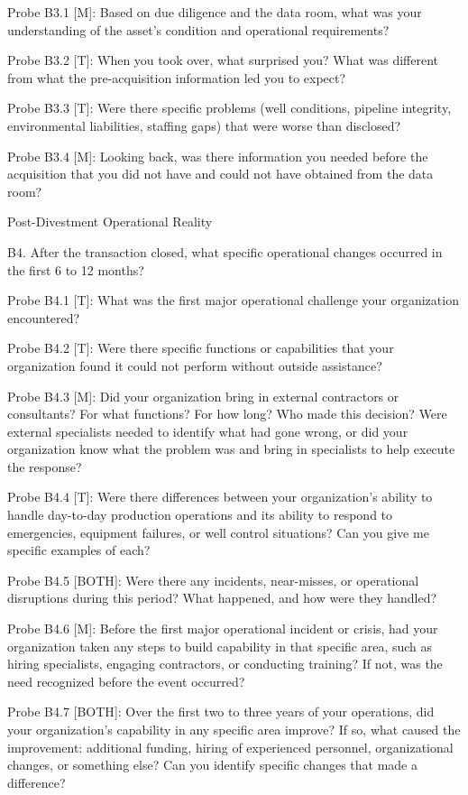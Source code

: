 Probe B3.1 {[}M{]}: Based on due diligence and the data room, what was
your understanding of the asset's condition and operational
requirements?

Probe B3.2 {[}T{]}: When you took over, what surprised you? What was
different from what the pre-acquisition information led you to expect?

Probe B3.3 {[}T{]}: Were there specific problems (well conditions,
pipeline integrity, environmental liabilities, staffing gaps) that were
worse than disclosed?

Probe B3.4 {[}M{]}: Looking back, was there information you needed
before the acquisition that you did not have and could not have obtained
from the data room?

Post-Divestment Operational Reality

B4. After the transaction closed, what specific operational changes
occurred in the first 6 to 12 months?

Probe B4.1 {[}T{]}: What was the first major operational challenge your
organization encountered?

Probe B4.2 {[}T{]}: Were there specific functions or capabilities that
your organization found it could not perform without outside assistance?

Probe B4.3 {[}M{]}: Did your organization bring in external contractors
or consultants? For what functions? For how long? Who made this
decision? Were external specialists needed to identify what had gone
wrong, or did your organization know what the problem was and bring in
specialists to help execute the response?

Probe B4.4 {[}T{]}: Were there differences between your organization's
ability to handle day-to-day production operations and its ability to
respond to emergencies, equipment failures, or well control situations?
Can you give me specific examples of each?

Probe B4.5 {[}BOTH{]}: Were there any incidents, near-misses, or
operational disruptions during this period? What happened, and how were
they handled?

Probe B4.6 {[}M{]}: Before the first major operational incident or
crisis, had your organization taken any steps to build capability in
that specific area, such as hiring specialists, engaging contractors, or
conducting training? If not, was the need recognized before the event
occurred?

Probe B4.7 {[}BOTH{]}: Over the first two to three years of your
operations, did your organization's capability in any specific area
improve? If so, what caused the improvement: additional funding, hiring
of experienced personnel, organizational changes, or something else? Can
you identify specific changes that made a difference?

